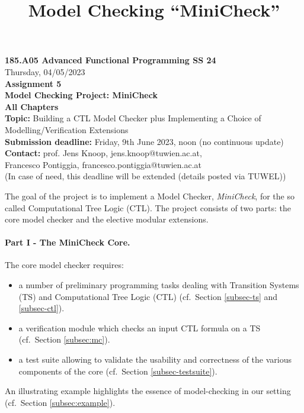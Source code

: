 \documentclass{article}
\title{Model Checking ``MiniCheck''}
\begin{document}
\large
\begin{center}
  {\Large \textbf{185.A05 Advanced Functional Programming SS 24}}  \\ [1ex] 
            Thursday, 04/05/2023 \\
               {\Large \textbf{Assignment 5}} \\[.5ex]
              {\Large \textbf{Model Checking Project: MiniCheck}} \\[.5ex]
                 \textbf{All Chapters}  \\ [.75ex]
           \textbf{Topic:} Building a CTL Model Checker plus Implementing a Choice of Modelling/Verification Extensions  \\[1ex]
          \textbf{Submission deadline:} Friday, 9th June 2023, noon (no continuous update)  \\ [0.5ex]
          \textbf{Contact:} prof. Jens Knoop, jens.knoop@tuwien.ac.at, \\
                            Francesco Pontiggia, francesco.pontiggia@tuwien.ac.at \\
                     (In case of need, this deadline will be extended (details posted via TUWEL))
\end{center}

\vspace{1ex}
\noindent
\noindent

\newcommand{\code}[1]{\texttt{#1}}

\noindent
The goal of the project is to implement a  Model Checker, \textit{MiniCheck}, 
for the so called Computational Tree Logic (CTL). 
The project consists of two parts: the core model checker and 
the elective modular extensions. 

\paragraph{Part I - The MiniCheck Core.} The core model checker requires: 
\begin{itemize}
    \item a number of preliminary programming tasks dealing with Transition Systems (TS)
          and Computational Tree Logic (CTL) (cf.~Section \ref{subsec-ts} and \ref{subsec-ctl}).
    \item a verification module which checks an input CTL formula on a TS (cf.~Section \ref{subsec:mc}).
    \item a test suite allowing to validate the usability and correctness of the
          various components of the core (cf.~Section \ref{subsec-testsuite}).
\end{itemize}  
An illustrating example highlights the essence of model-checking in our setting (cf.~Section \ref{subsec:example}). 
\end{document}
